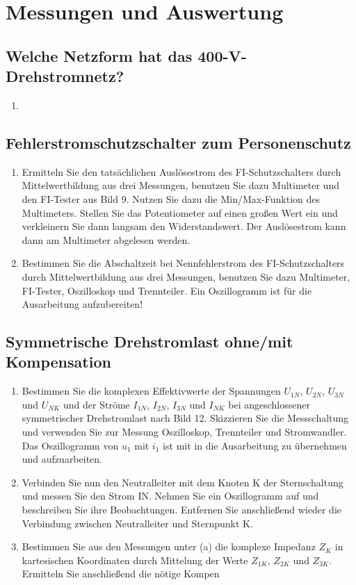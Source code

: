 \section{Messungen und Auswertung}

	\subsection{Welche Netzform hat das 400-V-Drehstromnetz?}
		\begin{enumerate}[label=\alph*)]
			\item 
		\end{enumerate}
		
	\subsection{Fehlerstromschutzschalter zum Personenschutz}
		\begin{enumerate}[label=\alph*)]
			\item Ermitteln Sie den tatsächlichen Auslösestrom des FI-Schutzschalters durch Mittelwertbildung aus drei Messungen, benutzen Sie dazu Multimeter und den FI-Tester aus Bild 9. Nutzen Sie dazu die Min/Max-Funktion des Multimeters. Stellen Sie das Potentiometer auf einen großen Wert ein und verkleinern Sie dann langsam den Widerstandswert. Der Auslösestrom kann dann am Multimeter abgelesen werden.
			
			\item Bestimmen Sie die Abschaltzeit bei Nennfehlerstrom des FI-Schutzschalters durch Mittelwertbildung aus drei Messungen, benutzen Sie dazu Multimeter, FI-Tester, Oszilloskop und Trennteiler. Ein Oszillogramm ist für die Ausarbeitung aufzubereiten! 
			
		\end{enumerate}
 	
 	\subsection{Symmetrische Drehstromlast ohne/mit Kompensation}
	 	\begin{enumerate}[label=\alph*)]
	 		\item Bestimmen Sie die komplexen Effektivwerte der Spannungen $U_{1N}$, $U_{2N}$, $U_{3N}$ und $U_{NK}$ und der Ströme $I_{1N}$, $I_{2N}$, $I_{3N}$ und $I_{NK}$ bei angeschlossener symmetrischer Drehstromlast nach Bild 12. Skizzieren Sie die Messschaltung und verwenden Sie zur Messung Oszilloskop, Trennteiler und Stromwandler. Das Oszillogramm von $u_{1}$ mit $i_{1}$ ist mit in die Ausarbeitung zu übernehmen und aufzuarbeiten.
	 		
	 		\item Verbinden Sie nun den Neutralleiter mit dem Knoten K der Sternschaltung und messen Sie den Strom IN. Nehmen Sie ein Oszillogramm auf und beschreiben Sie ihre Beobachtungen. Entfernen Sie anschließend wieder die Verbindung zwischen Neutralleiter und Sternpunkt K. 
	 		
	 		\item Bestimmen Sie aus den Messungen unter (a) die komplexe Impedanz $Z_{K}$ in kartesischen Koordinaten durch Mittelung der Werte $Z_{1K}$, $Z_{2K}$ und $Z_{3K}$. Ermitteln Sie anschließend die nötige Kompen
	 	\end{enumerate}
 	